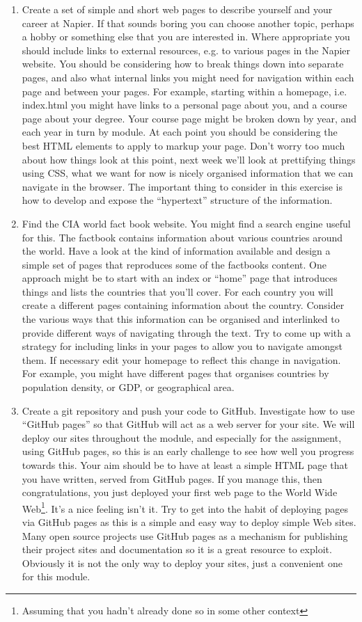 \documentclass[10pt, a4paper]{article}
\begin{document}
\begin{enumerate}
\item Create a set of simple and short web pages to describe yourself and your career at Napier. If that sounds boring you can choose another topic, perhaps a hobby or something else that you are interested in. Where appropriate you should include links to external resources, e.g. to various pages in the Napier website. You should be considering how to break things down into separate pages, and also what internal links you might need for navigation within each page and between your pages. For example, starting within a homepage, i.e. index.html you might have links to a personal page about you, and a course page about your degree. Your course page might be broken down by year, and each year in turn by module. At each point you should be considering the best HTML elements to apply to markup your page. Don't worry too much about how things look at this point, next week we'll look at prettifying things using CSS, what we want for now is nicely organised information that we can navigate in the browser. The important thing to consider in this exercise is how to develop and expose the ``hypertext'' structure of the information.
\item Find the CIA world fact book website. You might find a search engine useful for this. The factbook contains information about various countries around the world. Have a look at the kind of information available and design a simple set of pages that reproduces some of the factbooks content. One approach might be to start with an index or ``home'' page that introduces things and lists the countries that you'll cover. For each country you will create a different pages containing information about the country. Consider the various ways that this information can be organised and interlinked to provide different ways of navigating through the text. Try to come up with a strategy for including links in your pages to allow you to navigate amongst them. If necessary edit your homepage to reflect this change in navigation. For example, you might have different pages that organises countries by population density, or GDP, or geographical area.
\item Create a git repository and push your code to GitHub. Investigate how to use ``GitHub pages'' so that GitHub will act as a web server for your site. We will deploy our sites throughout the module, and especially for the assignment, using GitHub pages, so this is an early challenge to see how well you progress towards this. Your aim should be to have at least a simple HTML page that you have written, served from GitHub pages. If you manage this, then congratulations, you just deployed your first web page to the World Wide Web\footnote{Assuming that you hadn't already done so in some other context}. It's a nice feeling isn't it. Try to get into the habit of deploying pages via GitHub pages as this is a simple and easy way to deploy simple Web sites. Many open source projects use GitHub pages as a mechanism for publishing their project sites and documentation so it is a great resource to exploit. Obviously it is not the only way to deploy your sites, just a convenient one for this module.

\end{enumerate}
\end{document}
